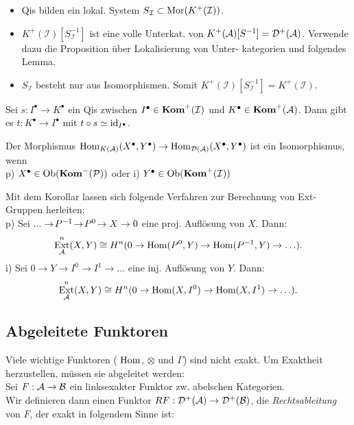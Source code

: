 \documentclass{cheat-sheet}
\newcommand{\CCC}[1]{{#1}^{\bullet}} %
\DeclareMathOperator{\Ext}{Ext} %
\newcommand{\Inj}{\mathcal{I}} %
\newcommand{\Proj}{\mathcal{P}} %
\begin{document}
\begin{beweisidee}
  \begin{itemize}
    \item Qis bilden ein lokal. System $S_\Inj \subset \Mor(K^+(\Inj))$.
    \item $K^+(\Inj)[S_\Inj^{-1}]$ ist eine volle Unterkat. von $K^+(\mathcal{A})[S^{-1}] = \mathcal{D}^+(\mathcal{A})$.
    Verwende dazu die Proposition über Lokalisierung von Unter- kategorien und folgendes Lemma.
    \item $S_\Inj$ besteht nur aus Isomorphismen. Somit $K^+(\Inj)[S_\Inj^{-1}] = K^+(\Inj)$.
  \end{itemize}
\end{beweisidee}

\begin{lem}
  Sei $s \!:\! \CCC{I} \!\to\! \CCC{K}$ ein Qis zwischen $\CCC{I} \in \Kom^+(\Inj)$ und $\CCC{K} \in \Kom^+(\Aat)$.
  Dann gibt es $t : \CCC{K} \to \CCC{I}$ mit $t \circ s \simeq \id_{\CCC{I}}$.
\end{lem}

\begin{kor}
  Der Morphismus \enspace $\Hom_{K(\Aat)}(\CCC{X}, \CCC{Y}) \to \Hom_{\Der(\Aat)}(\CCC{X}, \CCC{Y})$ ist ein Isomorphismus, wenn \\[2pt]
  p) \enspace $\CCC{X} \in \Ob(\Kom^-(\Proj))$ oder \quad
  i) \enspace $\CCC{Y} \in \Ob(\Kom^+(\Inj))$
\end{kor}

\begin{bem}
  Mit dem Korollar lassen sich folgende Verfahren zur Berechnung von Ext-Gruppen herleiten: \\[2pt]
  p) \enspace Sei $... \to\! P^{-1} \!\to\! P^0 \!\to X \to 0$ eine proj. Auflösung von $X$. Dann:
  \[ \Ext^n_\Aat(X, Y) \cong H^n(0 \to \Hom(P^0, Y) \to \Hom(P^{-1}, Y) \to \ldots). \]
  i) \enspace Sei $0 \to Y \to I^0 \to I^1 \to \ldots$ eine inj. Auflösung von $Y$. Dann:
  \[ \Ext^n_\Aat(X, Y) \cong H^n(0 \to \Hom(X, I^0) \to \Hom(X, I^1) \to \ldots). \]
\end{bem}

\subsection{Abgeleitete Funktoren}


\begin{ziel}
  Viele wichtige Funktoren (\zB{} $\operatorname{Hom}$, $\otimes$ und $\Gamma$) sind nicht exakt.
  Um Exaktheit herzustellen, müssen sie abgeleitet werden: \\
  Sei $F : \mathcal{A} \to \mathcal{B}$ ein linksexakter Funktor zw. abelschen Kategorien. \\
  Wir definieren dann einen Funktor $RF : \mathcal{D}^+(\mathcal{A}) \to \mathcal{D}^+(\mathcal{B})$, die \emph{Rechtsableitung} von $F$, der exakt in folgendem Sinne ist:
\end{ziel}
\end{document}
